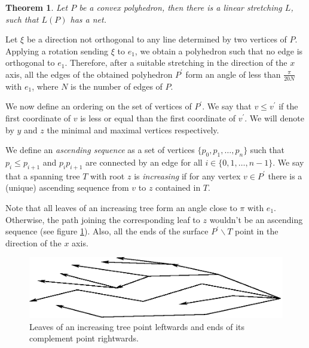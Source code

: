 \documentclass[openright, 12pt]{article}
\newtheorem{teorema}{Theorem}
\begin{document}
\begin{teorema}\label{Str}
{\rm Let $P$ be a convex polyhedron, then there is a linear stretching $L$, such that $L(P)$ has a net.}
\end{teorema}



Let $\xi $ be a direction not orthogonal to any line determined by two vertices of $P$. Applying a rotation sending $\xi $ to $e_1 $, we obtain a polyhedron such that no edge is orthogonal to $e_1$. Therefore, after a suitable stretching in the direction of the $x$ axis, all the edges of the obtained polyhedron $P^{\prime}$  form an angle of less than $\frac{\pi}{20 N}$ with $e_1$, where $N$ is the number of edges of $P$.


We now define an ordering on the set of vertices of $P^{\prime}$. We say that $v \leq v^{\prime}$ if the first coordinate of $v$ is less or equal than the first coordinate of $v^{\prime}$. We will denote by $y$ and $z$ the minimal and maximal vertices respectively.

We define an \textit{ascending sequence} as a set of vertices $\{ p_0, p_1, \ldots , p_n   \}$ such that $p_i \leq p_{i+1}$ and $p_i p_{i+1}$ are connected by an edge for all $i \in \{ 0,1, \ldots, n-1 \} $. We say that a spanning tree $T$ with root $z$ is \textit{increasing} if for any vertex $v\in P^{\prime}$ there is a (unique) ascending sequence from $v$ to $z$ contained in $T$. 

Note that all leaves of an increasing tree form an angle close to $\pi$ with $e_1$. Otherwise, the path joining the corresponding leaf to $z$ wouldn't be an ascending sequence (see figure \ref{Mon}). Also, all the ends of the surface $P^{\prime} \backslash T$ point in the direction of the $x$ axis.




\begin{figure}[h]
\centering
\includegraphics[scale=0.84]{Mono2.eps}
\caption{Leaves of an increasing tree point leftwards and ends of its complement point rightwards.}\label{Mon}
\end{figure}
\end{document}
